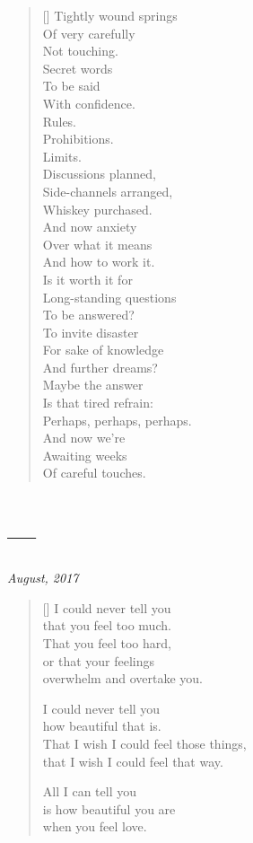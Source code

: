 \begin{verse}[\textwidth]
  Tightly wound springs\\
  Of very carefully\\
  Not touching.\\
  \vin Secret words\\
  \vin To be said\\
  \vin With confidence.\\
  Rules.\\
  Prohibitions.\\
  Limits.\\
  \vin Discussions planned,\\
  \vin Side-channels arranged,\\
  \vin Whiskey purchased.\\
  And now anxiety\\
  Over what it means\\
  And how to work it.\\
  \vin Is it worth it for\\
  \vin Long-standing questions\\
  \vin To be answered?\\
  To invite disaster\\
  For sake of knowledge\\
  And further dreams?\\
  \vin Maybe the answer\\
  \vin Is that tired refrain:\\
  \vin Perhaps, perhaps, perhaps.\\
  And now we're\\
  Awaiting weeks\\
  Of careful touches.
\end{verse}
\newpage

\section{---}

\hfill\textit{August, 2017}

\begin{verse}[\textwidth]
I could never tell you\\
that you feel too much.\\
That you feel too hard,\\
or that your feelings\\
overwhelm and overtake you.

I could never tell you\\
how beautiful that is.\\
That I wish I could feel those things,\\
that I wish I could feel that way.

All I can tell you\\
is how beautiful you are\\
when you feel love.
\end{verse}
\newpage

